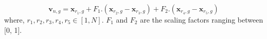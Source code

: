 \begin{equation}
    \mathbf{v}_{n, g}=\mathbf{x}_{r_{1}, g}
+F_{1}.\left(\mathbf{x}_{r_{2}, g}-\mathbf{x}_{r_{3}, g}\right)
+F_{2}.\left(\mathbf{x}_{r_{4}, g}-\mathbf{x}_{r_{5}, g}\right)
    \label{DE-rand-2}
\end{equation}
where, $r_1, r_2, r_3, r_4, r_5 \in [1, N]$. $F_1$ and $F_2$ are the scaling factors ranging between [0, 1].